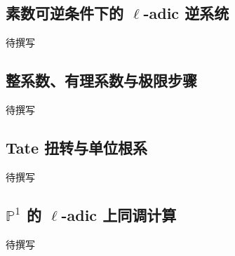 \subsection{\texorpdfstring{素数可逆条件下的 \(\ell\)-adic 逆系统}{素数可逆条件下的 \GeometryPdfEll{}-adic 逆系统}}
\label{g5:subsec:3504:06}
待撰写

\subsection{整系数、有理系数与极限步骤}
\label{g5:subsec:3504:07}
待撰写

\subsection{Tate 扭转与单位根系}
\label{g5:subsec:3504:08}
待撰写

\subsection{\texorpdfstring{\(\mathbb P^1\) 的 \(\ell\)-adic 上同调计算}{P¹ 的 \GeometryPdfEll{}-adic 上同调计算}}
\label{g5:subsec:3504:09}
待撰写
